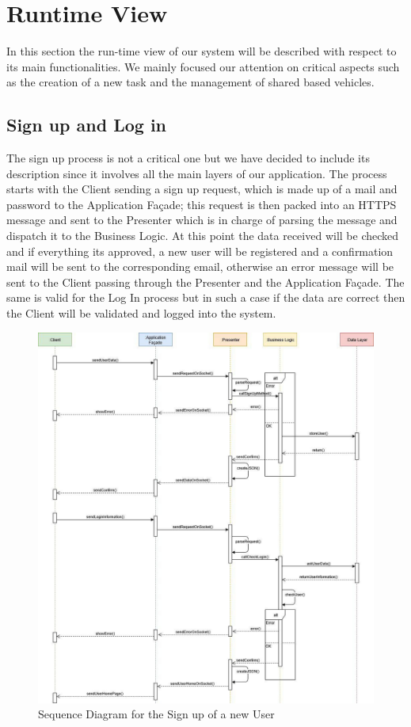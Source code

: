 \section{Runtime View}
In this section the run-time view of our system will be described with respect to its main functionalities. We mainly focused our attention on critical aspects such as the creation of a new task and the management of shared based vehicles.

\subsection{Sign up and Log in}
The sign up process is not a critical one but we have decided to include its description since it involves all the main layers of our application. 
The process starts with the Client sending a sign up request, which is made up of a mail and password to the Application Façade; this request is then packed into an HTTPS message and sent to the Presenter which is in charge of parsing the message and dispatch it to the Business Logic. At this point the data received will be checked and if everything its approved, a new user will be registered and a confirmation mail will be sent to the corresponding email, otherwise an error message will be sent to the Client passing through the Presenter and the Application Façade.
The same is valid for the Log In process but in such a case if the data are correct then the Client will be validated and logged into the system.

\begin{figure}[H]
    \centering
    \includegraphics[scale=0.55]{Pictures/RunTimeView/signIn.jpg}
    \caption{Sequence Diagram for the Sign up of a new User}
    \label{fig:sequenceSignUp}
\end{figure}


